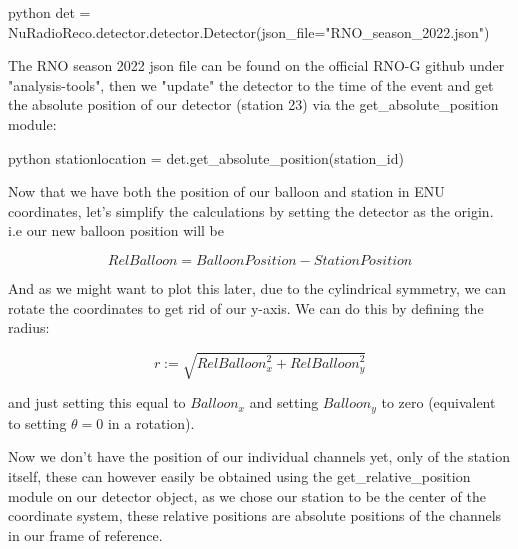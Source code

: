 \documentclass[11pt,a4paper,faculty=we,language=en,doctype=report]{cls/ugent-doc}
\begin{document}
\begin{mintedbox}{python}
det = NuRadioReco.detector.detector.Detector(json_file="RNO_season_2022.json")
\end{mintedbox}

The RNO season 2022 json file can be found on the official RNO-G github
under "analysis-tools", then we "update" the detector to the time of the event and get the
absolute position of our detector (station 23) via the get\_absolute\_position module:

\begin{mintedbox}{python}
	stationlocation = det.get_absolute_position(station_id)
\end{mintedbox}

Now that we have both the position of our balloon and station in ENU coordinates,
let's simplify the calculations by setting the detector as the origin.
i.e our new balloon position will be

\begin{equation}
	\textit{RelBalloon} = \textit{BalloonPosition} - \textit{StationPosition}
\end{equation}

And as we might want to plot this later, due to the cylindrical symmetry, we can rotate
the coordinates to get rid of our y-axis. We can do this by defining the radius:

\begin{equation}
	r := \sqrt{\textit{RelBalloon}_x^2 + \textit{RelBalloon}_y^2}
\end{equation}

and just setting this equal to $\textit{Balloon}_x$ and setting $\textit{Balloon}_y$ to
zero (equivalent to setting $\theta= 0$ in a rotation).

Now we don't have the position of our individual channels yet, only of the station itself,
these can however easily be obtained using the get\_relative\_position module on our
detector object, as we chose our station to be the center of the coordinate system,
these relative positions are absolute positions of the channels in our frame of reference.
\end{document}
